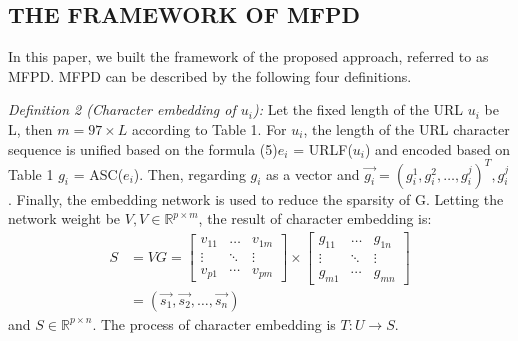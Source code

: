 \documentclass{ieeeaccess}
\begin{document}
\subsection{THE FRAMEWORK OF MFPD}
In this paper, we built the framework of the proposed
approach, referred to as MFPD. MFPD can be described by
the following four definitions.\vspace{6pt} \par \textit{Definition 2 (Character embedding of $u_{i}$):} Let the fixed length of the URL $u_{i}$ be L, then $m=97 \times L$ according to Table 1. For $u_{i}$, the length of the URL character sequence is
unified based on the formula (5)$e_{i}$ = URLF($u_{i}$) and encoded
based on Table 1 $g_{i}$ = ASC($e_{i}$). Then, regarding $g_{i}$ as a vector
and $\overrightarrow{g_{i}}=\left(g_{i}^{1}, g_{i}^{2}, \ldots, g_{i}^{j}\right)^{T}, g_{i}^{j}$. Finally, the embedding
network is used to reduce the sparsity of G. Letting the
network weight be $V, V \in \mathbb{R}^{p \times m}$, the result of character
embedding is: \begin{equation}
\begin{aligned} S &=V G=\left[\begin{array}{ccc}{v_{11}} & {\dots} & {v_{1 m}} \\ {\vdots} & {\ddots} & {\vdots} \\ {v_{p 1}} & {\cdots} & {v_{p m}}\end{array}\right] \times\left[\begin{array}{ccc}{g_{11}} & {\dots} & {g_{1 n}} \\ {\vdots} & {\ddots} & {\vdots} \\ {g_{m 1}} & {\cdots} & {g_{m n}}\end{array}\right] \\ &=(\overrightarrow{s_{1}}, \overrightarrow{s_{2}}, \dots, \overrightarrow{s_{n}}) \end{aligned}
\end{equation} and $S \in \mathbb{R}^{p \times n}$. The process of character embedding is $T: U \rightarrow S$.
\end{document}
